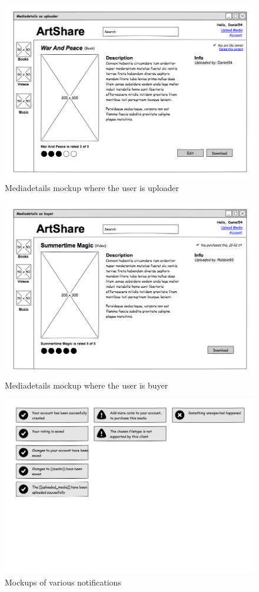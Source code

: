 \documentclass[../report.tex]{subfiles}
\begin{document}
\begin{figure}[H]
\centering
\includegraphics[scale=0.4]{mockups/mediauploader.png}
\caption{Mediadetails mockup where the user is uploader}
\end{figure}

\begin{figure}[H]
\centering
\includegraphics[scale=0.4]{mockups/mediabuyer.png}
\caption{Mediadetails mockup where the user is buyer}
\end{figure}

\begin{figure}[H]
\centering
\includegraphics[scale=0.4]{mockups/notifications.png}
\caption{Mockups of various notifications}
\end{figure}
\end{document}
